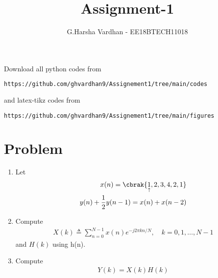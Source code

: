 \documentclass[journal,12pt,twocolumn]{IEEEtran}
\renewcommand\thesection{\arabic{section}}
\begin{document}
     \def\rightbox#1{\makebox[0in][r]{#1}}
     \def\centbox#1{\makebox[0in]{#1}}
     \def\topbox#1{\raisebox{-\baselineskip}[0in][0in]{#1}}
     \def\midbox#1{\raisebox{-0.5\baselineskip}[0in][0in]{#1}}
\vspace{3cm}
\title{Assignment-1}
\author{G.Harsha Vardhan - EE18BTECH11018}
\maketitle
\newpage
\bigskip
\renewcommand{\thefigure}{\theenumi}
\renewcommand{\thetable}{\theenumi}
Download all python codes from 
\begin{lstlisting}
https://github.com/ghvardhan9/Assignement1/tree/main/codes
\end{lstlisting}
%
and latex-tikz codes from 
%
\begin{lstlisting}
https://github.com/ghvardhan9/Assignement1/tree/main/figures
\end{lstlisting}

\section{Problem}
\begin{enumerate}[label=\thesection.\arabic*.,ref=\thesection.\theenumi]
    
    \item Let
    \begin{align}
        x(n) = \cbrak{\underset{\uparrow}{1},2,3,4,2,1}
         \label{eq:equation0}\\
        y(n) + \frac{1}{2}y(n-1) = x(n) + x(n-2)	
        \label{eq:equation1}
    \end{align}
    
    \item Compute 
    \begin{align}
        X(k) \triangleq \sum_{n=0}^{N-1} x(n) e^{-j 2 \pi k n / N}, \quad k=0,1, \ldots, N-1
    \end{align}
    and $H(k)$ using h(n).
    
    \item Compute 
    \begin{align}
    Y(k) = X(k)H(k)
    \end{align}
\end{enumerate}
\end{document}
